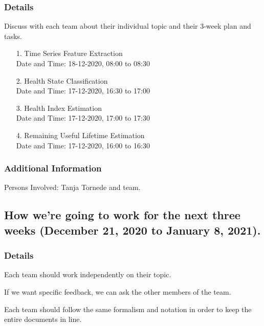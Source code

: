 \documentclass[11pt]{meetingmins} %
\begin{document}
    \subsubsection{Details}
        \begin{hiddensubitems}
            \item
                Discuss with each team about their individual topic and their 3-week plan and tasks.
                    \begin{enumerate}
                        \item[1.] Time Series Feature Extraction\\
                            Date and Time: 18-12-2020, 08:00 to 08:30 
                        \item[2.] Health State Classification\\
                            Date and Time: 17-12-2020, 16:30 to 17:00
                        \item[3.] Health Index Estimation\\
                            Date and Time: 17-12-2020, 17:00 to 17:30
                        \item[4.] Remaining Useful Lifetime Estimation\\
                            Date and Time: 17-12-2020, 16:00 to 16:30
                        \end{enumerate}
                    \end{hiddensubitems}
                    
    \subsubsection{Additional Information}
        \begin{hiddensubitems}
            \item
                Persons Involved: Tanja Tornede and team.
        \end{hiddensubitems}

\subsection{How we're going to work for the next three weeks (December 21, 2020 to January 8, 2021).}
    \subsubsection{Details}
        \begin{hiddensubitems}
            \item
                Each team should work independently on their topic.
            \item
                If we want specific feedback, we can ask the other members of the team.
            \item
                Each team should follow the same formalism and notation in order to keep the entire documents in line.
        \end{hiddensubitems}
        
\end{document}
